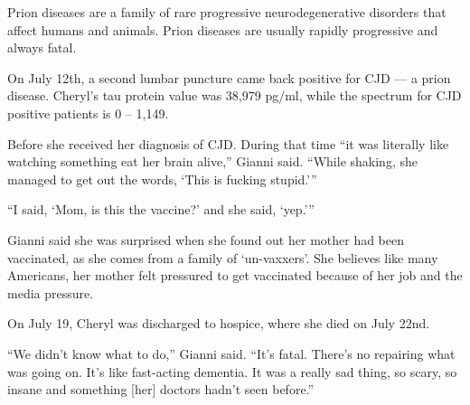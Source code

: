 Prion diseases are a family of rare progressive neurodegenerative disorders that
affect humans and animals. Prion diseases are usually rapidly progressive and
always fatal.

On July 12th, a second lumbar puncture came back positive for CJD — a prion
disease. Cheryl’s tau protein value was 38,979 pg/ml, while the spectrum for CJD
positive patients is 0 – 1,149.

Before she received her diagnosis of CJD. During that time “it was literally
like watching something eat her brain alive,” Gianni said. “While shaking, she
managed to get out the words, ‘This is fucking stupid.’”

“I said, ‘Mom, is this the vaccine?’ and she said, ‘yep.’”

Gianni said she was surprised when she found out her mother had been vaccinated,
as she comes from a family of ‘un-vaxxers’. She believes like many Americans,
her mother felt pressured to get vaccinated because of her job and the media
pressure.

On July 19, Cheryl was discharged to hospice, where she died on July 22nd.

“We didn’t know what to do,” Gianni said. “It’s fatal. There’s no repairing what
was going on. It’s like fast-acting dementia. It was a really sad thing, so
scary, so insane and something [her] doctors hadn’t seen before.”


